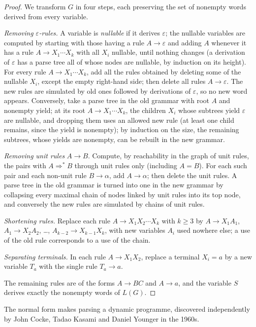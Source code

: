 \begin{proof}
We transform $G$ in four steps, each preserving the set of nonempty words derived from every variable.

\emph{Removing $\varepsilon$-rules.} A variable is \emph{nullable} if it derives $\varepsilon$; the nullable variables are computed by starting with those having a rule $A\to\varepsilon$ and adding $A$ whenever it has a rule $A\to X_1\cdots X_k$ with all $X_i$ nullable, until nothing changes (a derivation of $\varepsilon$ has a parse tree all of whose nodes are nullable, by induction on its height). For every rule $A\to X_1\cdots X_k$, add all the rules obtained by deleting some of the nullable $X_i$, except the empty right-hand side; then delete all rules $A\to\varepsilon$. The new rules are simulated by old ones followed by derivations of $\varepsilon$, so no new word appears. Conversely, take a parse tree in the old grammar with root $A$ and nonempty yield; at its root $A\to X_1\cdots X_k$, the children $X_i$ whose subtrees yield $\varepsilon$ are nullable, and dropping them uses an allowed new rule (at least one child remains, since the yield is nonempty); by induction on the size, the remaining subtrees, whose yields are nonempty, can be rebuilt in the new grammar.

\emph{Removing unit rules} $A\to B$. Compute, by reachability in the graph of unit rules, the pairs with $A\Rightarrow^*B$ through unit rules only (including $A=B$). For each such pair and each non-unit rule $B\to\alpha$, add $A\to\alpha$; then delete the unit rules. A parse tree in the old grammar is turned into one in the new grammar by collapsing every maximal chain of nodes linked by unit rules into its top node, and conversely the new rules are simulated by chains of unit rules.

\emph{Shortening rules.} Replace each rule $A\to X_1X_2\cdots X_k$ with $k\ge3$ by $A\to X_1A_1$, $A_1\to X_2A_2$, \dots, $A_{k-2}\to X_{k-1}X_k$, with new variables $A_i$ used nowhere else; a use of the old rule corresponds to a use of the chain.

\emph{Separating terminals.} In each rule $A\to X_1X_2$, replace a terminal $X_i=a$ by a new variable $T_a$ with the single rule $T_a\to a$.

The remaining rules are of the forms $A\to BC$ and $A\to a$, and the variable $S$ derives exactly the nonempty words of $L(G)$.
\end{proof}

The normal form makes parsing a dynamic programme, discovered independently by John Cocke, Tadao Kasami and Daniel Younger in the 1960s.

